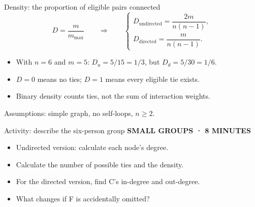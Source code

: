\documentclass[aspectratio=169,11pt]{beamer}
\newcommand{\activity}[1]{{\small\color{accent}\bfseries #1}\par\medskip}
\begin{document}
\begin{frame}{Density: the proportion of eligible pairs connected}
\[D=\frac{m}{m_{\max}}\qquad\Longrightarrow\qquad
\begin{cases}
D_{\mathrm{undirected}}=\dfrac{2m}{n(n-1)},\\[1.5ex]
D_{\mathrm{directed}}=\dfrac{m}{n(n-1)}.
\end{cases}\]
\begin{itemize}
\item With $n=6$ and $m=5$: $D_u=5/15=1/3$, but $D_d=5/30=1/6$.
\medskip
\item $D=0$ means no ties; $D=1$ means every eligible tie exists.
\medskip
\item Binary density counts ties, not the sum of interaction weights.
\end{itemize}
{\footnotesize Assumptions: simple graph, no self-loops, $n\geq2$.}
\end{frame}

\begin{frame}{Activity: describe the six-person group}
\activity{SMALL GROUPS · 8 MINUTES}
\begin{itemize}
\item Undirected version: calculate each node's degree.
\medskip
\item Calculate the number of possible ties and the density.
\medskip
\item For the directed version, find C's in-degree and out-degree.
\medskip
\item What changes if F is accidentally omitted?
\medskip
\end{itemize}

\end{frame}
\end{document}
